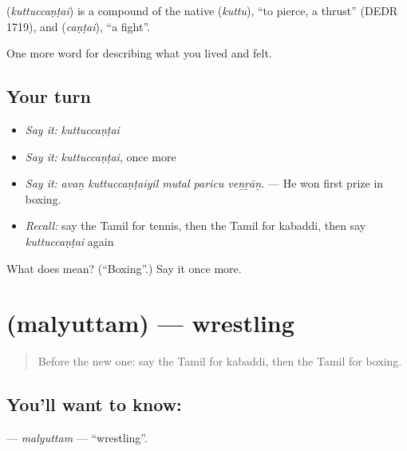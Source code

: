 \begin{cousinweb}
\textbf{} (\emph{kuttuccaṇṭai}) is a compound of the native  (\emph{kuttu}), \textquotedblleft{}to pierce, a thrust\textquotedblright{} (DEDR 1719), and  (\emph{caṇṭai}), \textquotedblleft{}a fight\textquotedblright{}.
\end{cousinweb}

\begin{grammarlens}[title={What you've built}]
One more word for describing what you lived and felt.
\end{grammarlens}

\subsection*{Your turn}
\begin{itemize}
\raggedright
  \item \emph{Say it:} \emph{kuttuccaṇṭai}
  \item \emph{Say it:} \emph{kuttuccaṇṭai}, once more
  \item \emph{Say it:} \emph{avaṉ kuttuccaṇṭaiyil mutal paricu veṉṟāṉ.} — He won first prize in boxing.
  \item \emph{Recall:} say the Tamil for tennis, then the Tamil for kabaddi, then say \emph{kuttuccaṇṭai} again
\end{itemize}

\begin{tcolorbox}[breakable,colback=teal!4,colframe=teal!35!black,title={Before you move on}]
What does  mean? (\textquotedblleft{}Boxing\textquotedblright{}.) Say it once more.
\end{tcolorbox}
\section[\texorpdfstring{\ta{மல்யுத்தம்} (malyuttam)}{மல்யுத்தம் (malyuttam)}]{ (malyuttam) — wrestling}

\label{lesson:TA-C532-malyuttam}



\begin{quote}
Before the new one: say the Tamil for kabaddi, then the Tamil for boxing.
\end{quote}

\subsection*{You'll want to know: }
\textbf{} — \emph{malyuttam} — \textquotedblleft{}wrestling\textquotedblright{}.

